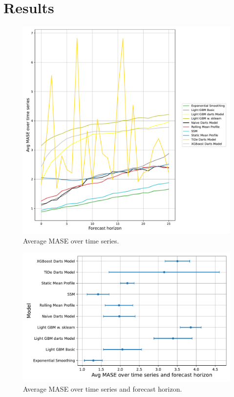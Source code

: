 \chapter{Results}


\begin{figure}[h]
	\centering
	\includegraphics[width=1\textwidth]{./figures/avg_mase_over_time_series.pdf}
	\caption{Average MASE over time series.}
	\label{fig:avg_mase_over_time_series}
\end{figure}

\begin{figure}[h]
	\centering
	\includegraphics[width=1\textwidth]{./figures/avg_mase_over_time_series_and_forecast_horizon.pdf}
	\caption{Average MASE over time series and forecast horizon.}
	\label{fig:avg_mase_over_time_series_and_forecast_horizon}
\end{figure}

